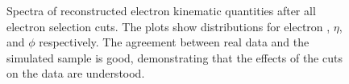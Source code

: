  \begin{figure}[htb]
  \begin{center}
  \end{center}
   \caption[\fixspacing Reconstructed electron \pt, $\eta$, $\phi$ spectra after full selection]{
   \fixspacing Spectra of reconstructed electron kinematic quantities after all electron selection cuts. 
   The plots show distributions for electron \pt, $\eta$, and $\phi$ respectively.  
   The agreement between real data and the simulated sample is good, demonstrating 
   that the effects of the cuts on the data are understood.  
  }
  \label{fig:RecoSpectraAfterEid}
 \end{figure}


